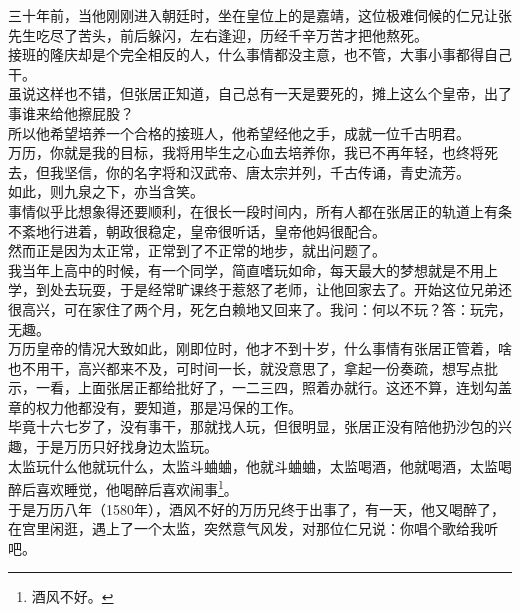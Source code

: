 \begin{multicols}{\theparacolNo}
三十年前，当他刚刚进入朝廷时，坐在皇位上的是嘉靖，这位极难伺候的仁兄让张先生吃尽了苦头，前后躲闪，左右逢迎，历经千辛万苦才把他熬死。\\

接班的隆庆却是个完全相反的人，什么事情都没主意，也不管，大事小事都得自己干。\\

虽说这样也不错，但张居正知道，自己总有一天是要死的，摊上这么个皇帝，出了事谁来给他擦屁股？\\

所以他希望培养一个合格的接班人，他希望经他之手，成就一位千古明君。\\

万历，你就是我的目标，我将用毕生之心血去培养你，我已不再年轻，也终将死去，但我坚信，你的名字将和汉武帝、唐太宗并列，千古传诵，青史流芳。\\

如此，则九泉之下，亦当含笑。\\

事情似乎比想象得还要顺利，在很长一段时间内，所有人都在张居正的轨道上有条不紊地行进着，朝政很稳定，皇帝很听话，皇帝他妈很配合。\\

然而正是因为太正常，正常到了不正常的地步，就出问题了。\\

我当年上高中的时候，有一个同学，简直嗜玩如命，每天最大的梦想就是不用上学，到处去玩耍，于是经常旷课终于惹怒了老师，让他回家去了。开始这位兄弟还很高兴，可在家住了两个月，死乞白赖地又回来了。我问：何以不玩？答：玩完，无趣。\\

万历皇帝的情况大致如此，刚即位时，他才不到十岁，什么事情有张居正管着，啥也不用干，高兴都来不及，可时间一长，就没意思了，拿起一份奏疏，想写点批示，一看，上面张居正都给批好了，一二三四，照着办就行。这还不算，连划勾盖章的权力他都没有，要知道，那是冯保的工作。\\

毕竟十六七岁了，没有事干，那就找人玩，但很明显，张居正没有陪他扔沙包的兴趣，于是万历只好找身边太监玩。\\

太监玩什么他就玩什么，太监斗蛐蛐，他就斗蛐蛐，太监喝酒，他就喝酒，太监喝醉后喜欢睡觉，他喝醉后喜欢闹事\footnote{酒风不好。}。\\

于是万历八年（1580年），酒风不好的万历兄终于出事了，有一天，他又喝醉了，在宫里闲逛，遇上了一个太监，突然意气风发，对那位仁兄说：你唱个歌给我听吧。\\


\end{multicols}
